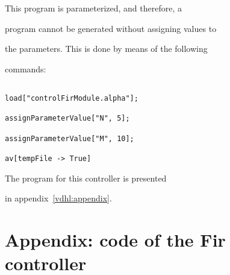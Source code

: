 This program is parameterized, and therefore, a \vhdl{}

program cannot be generated without assigning values to 

the parameters. This is done by means of the following

commands: 

\begin{verbatim}

load["controlFirModule.alpha"];

assignParameterValue["N", 5]; 

assignParameterValue["M", 10]; 

av[tempFile -> True]

\end{verbatim}

The \vhdl{} program for this controller is presented

in appendix~\ref{vdhl:appendix}.



\section*{Appendix: \vhdl{} code of the Fir controller}

\label{vhdl:appendix}

